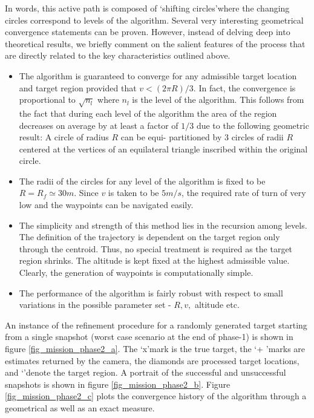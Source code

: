 In words, this active path is composed of \lq shifting circles\rq where the changing circles correspond to levels of the algorithm. Several very interesting geometrical convergence statements can be proven. However, instead of delving deep into theoretical results, we briefly comment on the salient features of the process that are directly related to the key characteristics outlined above. 

\begin{itemize}
\item The algorithm is guaranteed to converge for any admissible target location and target region provided that $v<(2\pi R)/3$. In fact, the convergence is proportional to $\sqrt{n_l}$ where $n_l$ is the level of the algorithm. This follows from the fact that during each level of the algorithm the area of the region decreases on average by at least a factor of $1/3$ due to the following geometric result: A circle of radius $R$ can be equi- partitioned by $3$ circles of radii $R$ centered at the vertices of an equilateral triangle inscribed within the original circle.

\item The radii of the circles for any level of the algorithm is fixed to be $R = R_f \simeq 30m$. Since $v$ is taken to be $5 m/s$, the required rate of turn of very low and the waypoints can be navigated easily.

\item The simplicity and strength of this method lies in the recursion among levels. The definition of the trajectory is dependent on the target region only through the centroid. Thus, no special treatment is required as the target region shrinks. The altitude is kept fixed at the highest admissible value. Clearly, the generation of waypoints is computationally simple.

\item The performance of the algorithm is fairly robust with respect to small variations in the possible parameter set - $R,v, $ altitude etc. 

\end{itemize}

An instance of the refinement procedure for a randomly generated target starting from a single snapshot (worst case scenario at the end of phase-1) is shown in figure \ref{fig_mission_phase2_a}. The \lq x\rq mark is the true target, the \lq + \rq marks are estimates returned by the camera, the diamonds are processed target locations, and \lq * \rq denote the target region. A portrait of the successful and unsuccessful snapshots is shown in figure \ref{fig_mission_phase2_b}. Figure \ref{fig_mission_phase2_c} plots the convergence history of the algorithm through a geometrical as well as an exact measure.

